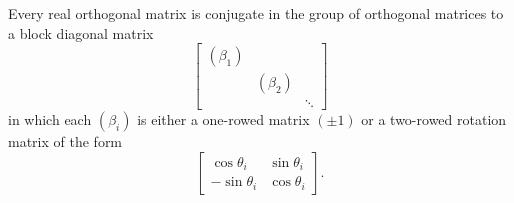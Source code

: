 Every real orthogonal matrix is conjugate in the group of orthogonal matrices to a block diagonal matrix
$$\begin{bmatrix}
(\beta_1) & & \\
& (\beta_2) & \\
& & \ddots
\end{bmatrix}$$
in which each $(\beta_i)$ is either a one-rowed matrix $(\pm 1)$ or a two-rowed rotation matrix of the form
$$\begin{bmatrix} \cos \theta_i & \sin \theta_i \\ -\sin \theta_i & \cos \theta_i \end{bmatrix}.$$
